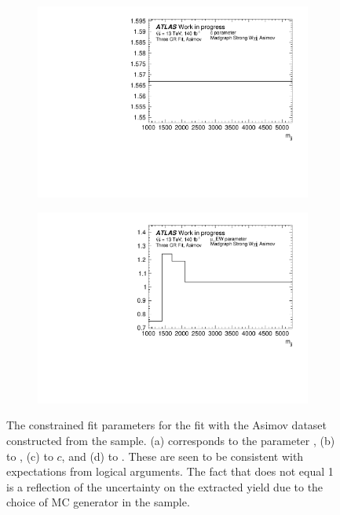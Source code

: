 \begin{figure}[t]
\begin{subfigure}[b]{0.48\textwidth}
    \includegraphics[width=\textwidth]{plots/diffx/mgasimovtest/c_constant_fx_mjj.pdf}
    \caption{}
\end{subfigure}
\hfill
\begin{subfigure}[b]{0.48\textwidth}
    \centering
    \includegraphics[width=\textwidth]{plots/diffx/mgasimovtest/muEW_constant_fx_mjj.pdf}
    \caption{}
\end{subfigure}
\caption{The constrained fit parameters for the fit with the Asimov dataset constructed from the \MADGRAPH \qcdwy sample. (a) corresponds to the parameter \bl, (b) to \bh, (c) to $c$, and (d) to \muew. These are seen to be consistent with expectations from logical arguments. The fact that \muew does not equal 1 is a reflection of the uncertainty on the extracted \ewwy yield due to the choice of MC generator in the \qcdwy sample.\label{fig:vbswy:mgasimovpars}}
\end{figure}

